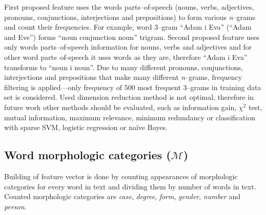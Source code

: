 \documentclass[11pt,english]{article}
\begin{document}
\begin{multicols}{2}
First proposed feature uses the words parts--of-speech
(nouns, verbs, adjectives, pronouns, conjunctions, interjections and
prepositions) to form various \emph{n}--grams and count their frequencies. For
example, word 3--gram ``Adam i Eva'' (``Adam and Eve'') forms ``noun
conjunction noun'' trigram. Second proposed feature uses only words
parts--of-speech information for nouns, verbs and adjectives and for other word
parts--of-speech it uses words as they are, therefore ``Adam i Eva'' transforms
to ``noun i noun''. Due to many different pronouns, conjunctions, interjections
and prepositions that make many different \emph{n}--grams, frequency filtering
is applied---only frequency of 500 most frequent 3--grams in
training data set is considered. Used dimension reduction method is not optimal,
therefore in future work other methods should be evaluated, such as information
gain, $\chi^2$ test, mutual information, maximum relevance, minimum redundancy
or classification with sparse SVM, logistic regression or na\"ive Bayes.

\subsection{Word morphologic categories ($\mathcal{M}$)}
\label{sec:morphosyntactic}
Building of feature vector is done by counting appearances of morphologic
categories for every word in text and dividing them by number of words in text.
Counted morphologic categories are \emph{case}, \emph{degree}, \emph{form},
\emph{gender}, \emph{number} and \emph{person}.

\end{multicols}
\end{document}
